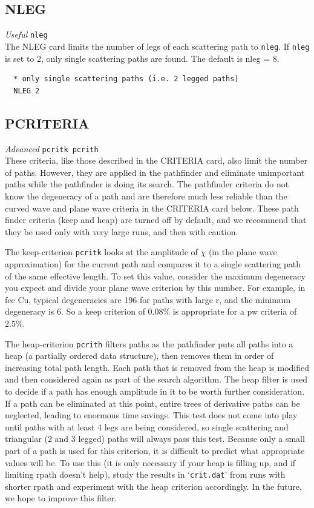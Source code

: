 \documentclass[11pt,oneside]{report} %
\renewcommand{\htmlref}[2]{\hyperlink{#2}{#1}}
\newenvironment{Card}[4]%
      {\vspace{3ex}%
        \subsection{#1}
        \quad\textsl{#3}\newline
        \quad\texttt{#2}\newline%
        \label{card:#4}\\}
      {}
\newcommand{\file}[1]{`\texttt{#1}'}
\renewcommand{\htmlref}[2]{{#1}} %
\begin{document}
\begin{Card}{NLEG}{nleg}{Useful}{nle}
  The NLEG card limits the number of legs of each scattering path to
  \texttt{nleg}. If \texttt{nleg} is set to 2, only single scattering
  paths are found. The default is nleg = 8.

\begin{verbatim}
  * only single scattering paths (i.e. 2 legged paths)
  NLEG 2
\end{verbatim}
\end{Card}



\begin{Card}{PCRITERIA}{pcritk pcrith}{Advanced}{pcr}
  These criteria, like those described in the CRITERIA card, also
  limit the number of paths. However, they are applied in the
  pathfinder and eliminate unimportant paths while the pathfinder is
  doing its search. The pathfinder criteria do not know the
  degeneracy of a path and are therefore much less reliable than the
  curved wave and plane wave criteria in the \htmlref{CRITERIA}{card:cri} 
  card below. These path finder criteria (keep and heap) are turned off 
  by default, and we recommend that they be used only with very large
  runs, and then with caution.

  The keep-criterion \texttt{pcritk} looks at the amplitude of $\chi$ (in the plane wave
  approximation) for the current path and compares it to a single scattering
  path of the same effective length. To set this value, consider the
  maximum degeneracy you expect and divide your plane wave criterion
  by this number. For example, in fcc Cu, typical degeneracies are
  196 for paths with large r, and the minimum degeneracy is 6. So a
  keep criterion of 0.08\% is appropriate for a pw criteria of 2.5\%.

  The heap-criterion \texttt{pcrith} filters paths as the pathfinder 
  puts all paths into a heap (a partially ordered data structure), then 
  removes them in order of increasing total path length. Each path that 
  is removed from the heap is modified and then considered again as part 
  of the search algorithm. The heap filter is used to decide if a path has
  enough amplitude in it to be worth further consideration. If a path can
  be eliminated at this point, entire trees of derivative paths can
  be neglected, leading to enormous time savings. This test does not
  come into play until paths with at least 4 legs are being
  considered, so single scattering and triangular (2 and 3 legged)
  paths will always pass this test. Because only a small part of a
  path is used for this criterion, it is difficult to predict what
  appropriate values will be. To use this (it is only necessary if
  your heap is filling up, and if limiting rpath doesn't help), study
  the results in \file{crit.dat} from runs with shorter rpath and experiment
  with the heap criterion accordingly. In the future, we hope to
  improve this filter.


\end{Card}
\end{document}
